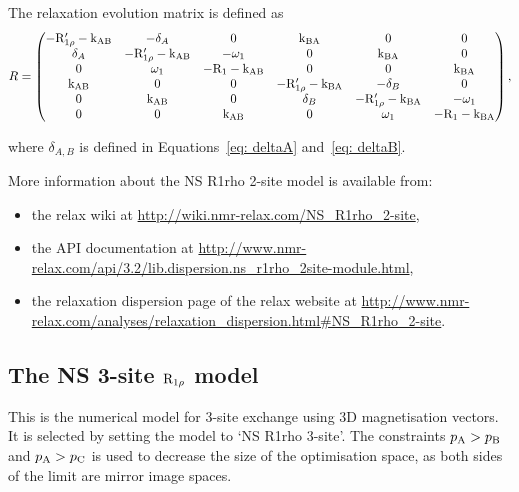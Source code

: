 The relaxation evolution matrix is defined as
\begin{equation}
    R = \begin{pmatrix}
          -\mathrm{R}_{1\rho}'-\textrm{k}_{\textrm{AB}} & -\delta_A           & 0           & \textrm{k}_{\textrm{BA}}                & 0                   & 0 \\
          \delta_A            & -\mathrm{R}_{1\rho}'-\textrm{k}_{\textrm{AB}} & -\omega_1  & 0                   & \textrm{k}_{\textrm{BA}}                & 0 \\
          0                   & \omega_1           & -\mathrm{R}_1-\textrm{k}_{\textrm{AB}} & 0                   & 0                   & \textrm{k}_{\textrm{BA}} \\
          \textrm{k}_{\textrm{AB}}                & 0                   & 0           & -\mathrm{R}_{1\rho}'-\textrm{k}_{\textrm{BA}} & -\delta_B           & 0 \\
          0                   & \textrm{k}_{\textrm{AB}}                & 0           & \delta_B            & -\mathrm{R}_{1\rho}'-\textrm{k}_{\textrm{BA}} & -\omega_1 \\
          0                   & 0                   & \textrm{k}_{\textrm{AB}}        & 0                   & \omega_1           & -\mathrm{R}_1-\textrm{k}_{\textrm{BA}} \\
        \end{pmatrix},
\end{equation}

where $\delta_{A,B}$ is defined in Equations~\ref{eq: deltaA} and~\ref{eq: deltaB}.

More information about the NS R1rho 2-site model is available from:
\begin{itemize}
  \item the relax wiki at \url{http://wiki.nmr-relax.com/NS\_R1rho\_2-site},
  \item the API documentation at \url{http://www.nmr-relax.com/api/3.2/lib.dispersion.ns\_r1rho\_2site-module.html},
  \item the relaxation dispersion page of the relax website at \url{http://www.nmr-relax.com/analyses/relaxation\_dispersion.html#NS\_R1rho\_2-site}.
\end{itemize}



\subsection{The NS 3-site $\mathrm{R}_{1\rho}$ model}
\label{sect: dispersion: NS R1rho 3-site model}

This is the numerical model for 3-site exchange using 3D magnetisation vectors.
It is selected by setting the model to `NS R1rho 3-site'.
The constraints $p_{\textrm{A}} > p_{\textrm{B}}$ and $p_{\textrm{A}} > p_{\textrm{C}}$ is used to decrease the size of the optimisation space, as both sides of the limit are mirror image spaces.

